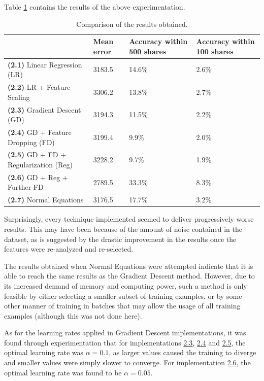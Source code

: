 \documentclass[10pt,twocolumn,letterpaper]{article}
\begin{document}
Table \ref{table:results} contains the results of the above experimentation.

\begin{table}
\begin{center}
    \begin{tabular}{ | l | l | l | l |}
    \hline
     & \textbf{Mean error} & \textbf{Accuracy within 500 shares} & \textbf{Accuracy within 100 shares} \\ \hline
    \textbf{(2.1)} Linear Regression (LR) & 3183.5 & 14.6\% & 2.6\% \\ \hline
    \textbf{(2.2)} LR + Feature Scaling & 3306.2 & 13.8\% & 2.7\% \\ \hline
    \textbf{(2.3)} Gradient Descent (GD) & 3194.3 & 11.5\% & 2.2\% \\ \hline
    \textbf{(2.4)} GD + Feature Dropping (FD) & 3199.4 & 9.9\% & 2.0\% \\ \hline
    \textbf{(2.5)} GD + FD + Regularization (Reg) & 3228.2 & 9.7\% & 1.9\% \\ \hline
    \textbf{(2.6)} GD + Reg + Further FD & 2789.5 & 33.3\% & 8.3\% \\ \hline
    \textbf{(2.7)} Normal Equations & 3176.5 & 17.7\% & 3.2\% \\ 
    \hline
    \end{tabular}
    \caption{Comparison of the results obtained.\label{table:results}} 
\end{center}  
\end{table}

Surprisingly, every technique implemented seemed to deliver progressively worse results. This may have been because of the amount of noise contained in the dataset, as is suggested by the drastic improvement in the results once the features were re-analyzed and re-selected.

The results obtained when Normal Equations were attempted indicate that it is able to reach the same results as the Gradient Descent method. However, due to its increased demand of memory and computing power, such a method is only feasible by either selecting a smaller subset of training examples, or by some other manner of training in batches that may allow the usage of all training examples (although this was not done here).

As for the learning rates applied in Gradient Descent implementations, it was found through experimentation that for implementations \hyperref[sec:gd]{2.3}, \hyperref[sec:gdfd]{2.4} and \hyperref[sec:gdr]{2.5}, the optimal learning rate was $\alpha = 0.1$, as larger values caused the training to diverge and smaller values were simply slower to converge. For implementation \hyperref[sec:gdrfd]{2.6}, the optimal learning rate was found to be $\alpha = 0.05$.
\end{document}
